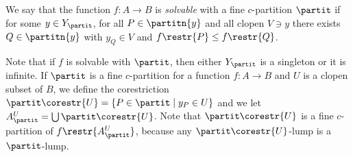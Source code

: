 \begin{definition}
We say that the function $f:A\to B$ is \emph{solvable} {with} a fine $c$-partition $\partit$ if for some $y\in Y_\partit$, for all $P\in\partitn{y}$ and all clopen $V\ni y$ there exists $Q\in \partitn{y}$ with $y_{Q}\in V$ and $f\restr{P}\leq f\restr{Q}$. 

\end{definition}
Note that if $f$ is solvable with $\partit$, then either $Y_\partit$ is a singleton or it is infinite.
If $\partit$ is a fine $c$-partition for a function $f:A\to B$ and $U$ is a clopen subset of $B$,
we define the corestriction $\partit\corestr{U}=\{P\in \partit \mid y_P\in U\}$ and we let $A^U_\partit=\bigcup \partit\corestr{U}$.
Note that $\partit\corestr{U}$ is a fine $c$-partition of $f\restr{A^U_\partit}$, because any $\partit\corestr{U}$-lump is a $\partit$-lump.


